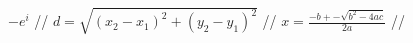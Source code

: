 \documentclass{article}
\begin{document}
$-e^{i}$ //
$d=\sqrt{(x_2-x_1)^2+(y_2-y_1)^2}$ //
$x=\frac{-b+-\sqrt{b^2-4ac}}{2a}$ //
\end{document}
